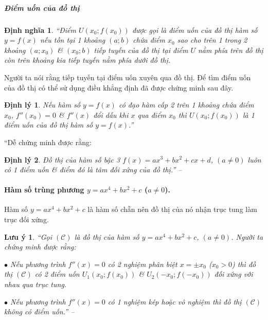 \documentclass{article}
\numberwithin{equation}{section}
\newtheorem{dinhnghia}{Định nghĩa}[section]
\newtheorem{luuy}{Lưu ý}[section]
\newtheorem{dinhly}{Định lý}[section]
\begin{document}
\subparagraph{Điểm uốn của đồ thị}

\begin{dinhnghia}
	``Điểm $U(x_0;f(x_0))$ được gọi là \emph{điểm uốn} của đồ thị hàm số $y = f(x)$ nếu tồn tại 1 khoảng $(a;b)$ chứa điểm $x_0$ sao cho trên 1 trong 2 khoảng $(a;x_0)$ \& $(x_0;b)$ tiếp tuyến của đồ thị tại điểm $U$ nằm phía trên đồ thị còn trên khoảng kia tiếp tuyến nằm phía dưới đồ thị.
\end{dinhnghia}
Người ta nói rằng tiếp tuyến tại điểm uốn xuyên qua đồ thị. Để tìm điểm uốn của đồ thị có thể sử dụng điều khẳng định đã được chứng minh sau đây.

\begin{dinhly}
	Nếu hàm số $y = f(x)$ có đạo hàm cấp 2 trên 1 khoảng chứa điểm $x_0$, $f''(x_0) = 0$  \& $f''(x)$ đổi dấu khi $x$ qua điểm $x_0$ thì $U(x_0;f(x_0))$ là 1 điểm uốn của đồ thị hàm số $y = f(x)$.''
\end{dinhly}
``Dễ chứng minh được rằng: 

\begin{dinhly}
	Đồ thị của hàm số bậc 3 $f(x) = ax^3 + bx^2 + cx + d$, $(a\ne 0)$ luôn có 1 điểm uốn \& điểm đó là tâm đối xứng của đồ thị.''  -- \cite[p. 39]{SGK_Toan_12_giai_tich_nang_cao}
\end{dinhly}

\paragraph{Hàm số trùng phương $y = ax^4 + bx^2 + c$ ($a\ne 0$).} Hàm số $y = ax^4 + bx^2 + c$ là hàm số chẵn nên đồ thị của nó nhận trục tung làm trục đối xứng.

\begin{luuy}
	``Gọi $(\mathcal{C})$ là đồ thị của hàm số $y = ax^4 + bx^2 + c$, $(a\ne 0)$. Người ta chứng minh được rằng:
	\begin{enumerate*}
		\item[$\bullet$] Nếu phương trình $f''(x) = 0$ có 2 nghiệm phân biệt $x = \pm x_0$ ($x_0 > 0$) thì đồ thị $(\mathcal{C})$ có 2 điểm uốn $U_1(x_0;f(x_0))$ \& $U_2(-x_0;f(-x_0))$ đối xứng với nhau qua trục tung.
		\item[$\bullet$] Nếu phương trình $f''(x) = 0$ có 1 nghiệm kép hoặc vô nghiệm thì đồ thị $(\mathcal{C})$ không có điểm uốn.'' -- \cite[p. 43]{SGK_Toan_12_giai_tich_nang_cao}
	\end{enumerate*}
\end{luuy}

\end{document}
